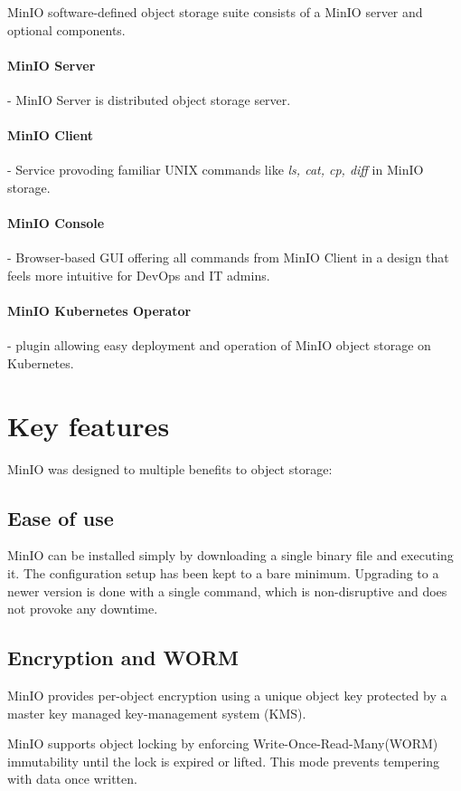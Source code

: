     MinIO software-defined object storage suite consists of a MinIO server and optional components.

    \paragraph{MinIO Server} - MinIO Server is distributed object storage server.
    \paragraph{MinIO Client} - Service provoding familiar UNIX commands like \textit{ls, cat, cp, diff} in MinIO storage.
    \paragraph{MinIO Console} - Browser-based GUI offering all commands from MinIO Client in a design that feels more intuitive for DevOps and IT admins.
    \paragraph{MinIO Kubernetes Operator} - plugin allowing easy deployment and operation of MinIO object storage on Kubernetes.

\section{Key features}
    MinIO was designed to multiple benefits to object storage:

    \subsection*{Ease of use}
    MinIO can be installed simply by downloading a single binary file and executing it. The configuration setup has been kept to a bare minimum. Upgrading to a newer version is done with a single command, which is non-disruptive and does not provoke any downtime\cite{minioIntel}.

    \subsection*{Encryption and WORM}
    MinIO provides per-object encryption using a unique object key protected by a master key managed key-management system (KMS).

    MinIO supports object locking by enforcing Write-Once-Read-Many(WORM) immutability until the lock is expired or lifted. This mode prevents tempering with data once written\cite{minioHighPerformance}.

